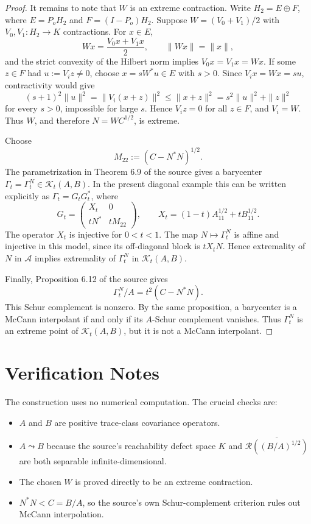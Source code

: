 \documentclass[11pt]{article}
\newcommand{\KK}{\mathcal K}
\newcommand{\cA}{\mathcal A}
\newcommand{\cR}{\mathcal R}
\begin{document}
\begin{proof}
It remains to note that \(W\) is an extreme contraction.  Write
\(H_2=E\oplus F\), where \(E=P_oH_2\) and \(F=(I-P_o)H_2\).  Suppose
\(W=(V_0+V_1)/2\) with \(V_0,V_1:H_2\to K\) contractions.  For \(x\in E\),
\[
  Wx=\frac{V_0x+V_1x}{2},\qquad \|Wx\|=\|x\|,
\]
and the strict convexity of the Hilbert norm implies \(V_0x=V_1x=Wx\).  If
some \(z\in F\) had \(u:=V_i z\neq0\), choose \(x=sW^*u\in E\) with
\(s>0\).  Since \(V_i x=Wx=su\), contractivity would give
\[
  (s+1)^2\|u\|^2=\|V_i(x+z)\|^2
      \leq \|x+z\|^2=s^2\|u\|^2+\|z\|^2
\]
for every \(s>0\), impossible for large \(s\).  Hence \(V_i z=0\) for all
\(z\in F\), and \(V_i=W\).  Thus \(W\), and therefore \(N=WC^{1/2}\), is
extreme.

Choose
\[
  M_{22}:=(C-N^*N)^{1/2}.
\]
The parametrization in Theorem 6.9 of the source gives a barycenter
\(\Gamma_t=\Gamma_t^N\in\KK_t(A,B)\).  In the present diagonal example this
can be written explicitly as \(\Gamma_t=G_tG_t^*\), where
\[
  G_t=
  \begin{pmatrix}
    X_t&0\\
    tN^*&tM_{22}
  \end{pmatrix},
  \qquad
  X_t=(1-t)A_{11}^{1/2}+tB_{11}^{1/2}.
\]
The operator \(X_t\) is injective for \(0<t<1\).  The map
\(N\mapsto \Gamma_t^N\) is affine and injective in this model, since its
off-diagonal block is \(tX_tN\).  Hence extremality of \(N\) in \(\cA\)
implies extremality of \(\Gamma_t^N\) in \(\KK_t(A,B)\).

Finally, Proposition 6.12 of the source gives
\[
  \Gamma_t^N/A=t^2(C-N^*N).
\]
This Schur complement is nonzero.  By the same proposition, a barycenter is a
McCann interpolant if and only if its \(A\)-Schur complement vanishes.  Thus
\(\Gamma_t^N\) is an extreme point of \(\KK_t(A,B)\), but it is not a McCann
interpolant.
\end{proof}

\section*{Verification Notes}

The construction uses no numerical computation.  The crucial checks are:
\begin{itemize}[leftmargin=*]
\item \(A\) and \(B\) are positive trace-class covariance operators.
\item \(A\leadsto B\) because the source's reachability defect space \(K\) and
      \(\overline{\cR((B/A)^{1/2})}\) are both separable infinite-dimensional.
\item The chosen \(W\) is proved directly to be an extreme contraction.
\item \(N^*N<C=B/A\), so the source's own Schur-complement criterion rules out
      McCann interpolation.
\end{itemize}
\end{document}
